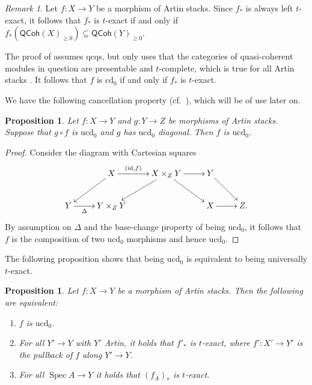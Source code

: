 \documentclass[a4paper,twoside,11pt]{amsart}
\theoremstyle{plain}
\newtheorem{proposition}[theorem]{Proposition}
\theoremstyle{definition}
\theoremstyle{remark}
\newtheorem{remark}[theorem]{Remark}
\numberwithin{equation}{section}
\newcommand{\id}{\mathrm{id}} %
\newcommand{\cd}{\mathrm{cd}}
\newcommand{\ucd}{$\mathrm{ucd}_{0}$\xspace}
\renewcommand{\cd}{$\mathrm{cd}_{0}$\xspace}
\DeclareMathOperator{\Spec}{Spec} %
\newcommand{\QCoh}{\mathsf{QCoh}}
\begin{document}
\begin{remark} \label{rem:2.4}
    Let $f \colon X \to Y$ be a morphism of Artin stacks. Since $f_*$ is always left $t$-exact, it follows that $f_*$ is $t$-exact if and only if $f_*(\QCoh(X)_{\geq 0}) \subseteq \QCoh(Y)_{\geq 0}$.

    The proof of \cite[Lem.~A.1.6]{HalpernleistnerMapping} assumes qcqs, but only uses that the categories of quasi-coherent modules in question are presentable and $t$-complete, which is true for all Artin stacks \cite[Ch.~3, Cor.~1.5.7]{GaitsgoryStudy}. It follows that $f$ is \cd if and only if $f_*$ is $t$-exact.
\end{remark}

We have the following cancellation property (cf.~\cite[Prop.~3.13]{AlperGood}), which will be of use later on.

\begin{proposition} \label{Prop:cancellation property}
    Let $f \colon X \to Y$ and $g \colon Y \to Z$ be morphisms of Artin stacks. Suppose that $g \circ f$ is \ucd and $g$ has \ucd diagonal. Then $f$ is \ucd.
\end{proposition}

\begin{proof}
    Consider the diagram with Cartesian squares
    \begin{align*}
    \xymatrix{
    & X \ar[r]^-{(\id, f)} \ar[dl] & X \times_Z Y \ar[r] \ar[dr] \ar[dl] & Y \ar[dr] \\
    Y \ar[r]_-{\Delta} & Y \times_Z Y & & X \ar[r] & Z.
    }
    \end{align*}
    By assumption on $\Delta$ and the base-change property of being \ucd, it follows that $f$ is the composition of two \ucd morphisms and hence \ucd.
\end{proof}

The following proposition shows that being \ucd is equivalent to being universally $t$-exact.

\begin{proposition}
\label{Prop:ucd0_equivalent}
    Let $f \colon X \to Y$ be a morphism of Artin stacks. Then the following are equivalent:
    \begin{enumerate}
        \item $f$ is \ucd.
        \item For all $Y' \to Y$ with $Y'$ Artin, it holds that $f'_*$ is $t$-exact, where $f' \colon X' \to Y'$ is the pullback of $f$ along $Y' \to Y$.
        \item For all $\Spec A \to Y$ it holds that $(f_A)_*$ is $t$-exact.
    \end{enumerate}
\end{proposition}
\end{document}
